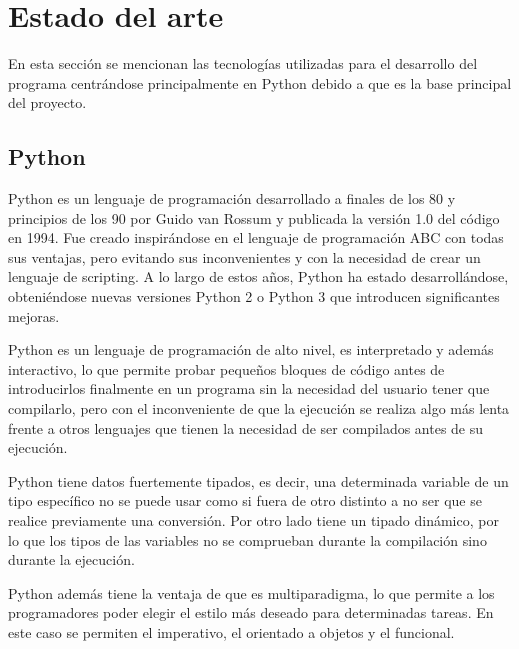 \documentclass[a4paper, 12pt]{book}
\begin{document}

\cleardoublepage
\chapter{Estado del arte}
En esta sección se mencionan las tecnologías utilizadas para el desarrollo del programa centrándose principalmente en Python debido a que es la base principal del proyecto.



\section{Python} 
\label{sec:seccion1}

Python es un lenguaje de programación desarrollado a finales de los 80 y principios de los 90 por Guido van Rossum y publicada la versión 1.0 del código en 1994. Fue creado inspirándose en el lenguaje de programación ABC con todas sus ventajas, pero evitando sus inconvenientes y con la necesidad de crear un lenguaje de scripting. A lo largo de estos años, Python ha estado desarrollándose, obteniéndose nuevas versiones Python 2 o Python 3 que introducen significantes mejoras. 

Python es un lenguaje de programación de alto nivel, es interpretado y además interactivo, lo que permite probar pequeños bloques de código antes de introducirlos finalmente en un programa sin la necesidad del usuario tener que compilarlo, pero con el inconveniente de que la ejecución se realiza algo más lenta frente a otros lenguajes que tienen la necesidad de ser compilados antes de su ejecución.

Python tiene datos fuertemente tipados, es decir, una determinada variable de un tipo específico no se puede usar como si fuera de otro distinto a no ser que se realice previamente una conversión. Por otro lado tiene un tipado dinámico, por lo que los tipos de las variables no se comprueban durante la compilación sino durante la ejecución.

Python además tiene la ventaja de que es multiparadigma, lo que permite a los programadores poder elegir el estilo más deseado para determinadas tareas. En este caso se permiten el imperativo, el orientado a objetos y el funcional.
\end{document}
